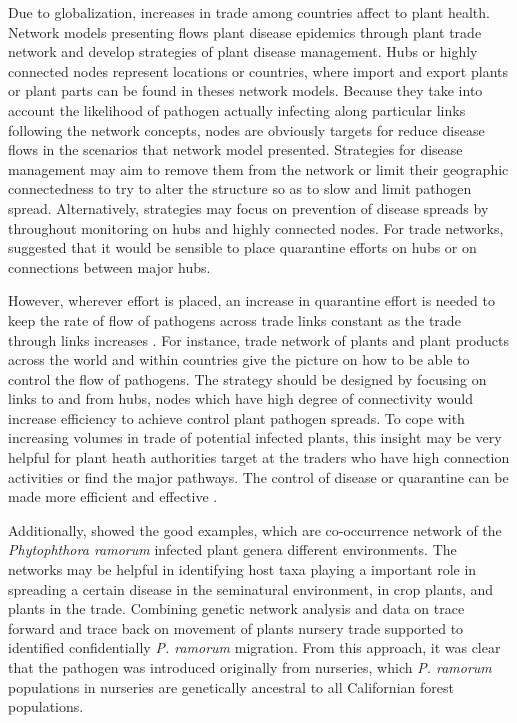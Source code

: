 Due to globalization, increases in trade among countries affect to plant health. Network models presenting flows plant disease epidemics through plant trade network and develop strategies of plant disease management. Hubs or highly connected nodes represent locations or countries, where import and export plants or plant parts can be found in theses network models. Because they take into account the likelihood of pathogen actually infecting along particular links following the network concepts, nodes are obviously targets for reduce disease flows in the scenarios that network model presented. Strategies for disease management may aim to remove them from the network or limit their geographic connectedness to try to alter the structure so as to slow and limit pathogen spread. Alternatively, strategies may focus on prevention of disease spreads by throughout monitoring on hubs and highly connected nodes. For trade networks,  suggested that it would be sensible to place quarantine efforts on hubs or on connections between major hubs.

However, wherever effort is placed, an increase in quarantine effort is needed to keep the rate of flow of pathogens across trade links constant as the trade through links increases . For instance, trade network of plants and plant products across the world and within countries give the picture on how to be able to control the flow of pathogens. The strategy should be designed by focusing on links to and from hubs, nodes which have high degree of connectivity would increase efficiency to achieve control plant pathogen spreads. To cope with increasing volumes in trade of potential infected plants, this insight may be very helpful for plant heath authorities target at the traders who have high connection activities or find the major pathways. The control of disease or quarantine can be made more efficient and effective .

Additionally,  showed the good examples, which are co-occurrence network of the \textit{Phytophthora ramorum} infected plant genera different environments. The networks may be helpful in identifying host taxa playing a important role in spreading a certain disease in the seminatural environment, in crop plants, and plants in the trade. Combining genetic network analysis and data on trace forward and trace back on movement of plants nursery trade supported to identified confidentially \textit{P. ramorum} migration. From this approach, it was clear that the pathogen was introduced originally from nurseries, which \textit{P. ramorum} populations in nurseries are genetically ancestral to all Californian forest populations.

